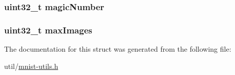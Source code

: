 \subsubsection[{magic\+Number}]{\setlength{\rightskip}{0pt plus 5cm}uint32\+\_\+t magic\+Number}\label{struct_m_n_i_s_t___label_file_header_a3081fb3d81f6a8484b9451a66e4d1dba}
\hypertarget{struct_m_n_i_s_t___label_file_header_a0c2553aeb6074229351ddfd76c613831}{}
\subsubsection[{max\+Images}]{\setlength{\rightskip}{0pt plus 5cm}uint32\+\_\+t max\+Images}\label{struct_m_n_i_s_t___label_file_header_a0c2553aeb6074229351ddfd76c613831}


The documentation for this struct was generated from the following file\+:\begin{DoxyCompactItemize}
\item 
util/\hyperlink{mnist-utils_8h}{mnist-\/utils.\+h}\end{DoxyCompactItemize}
